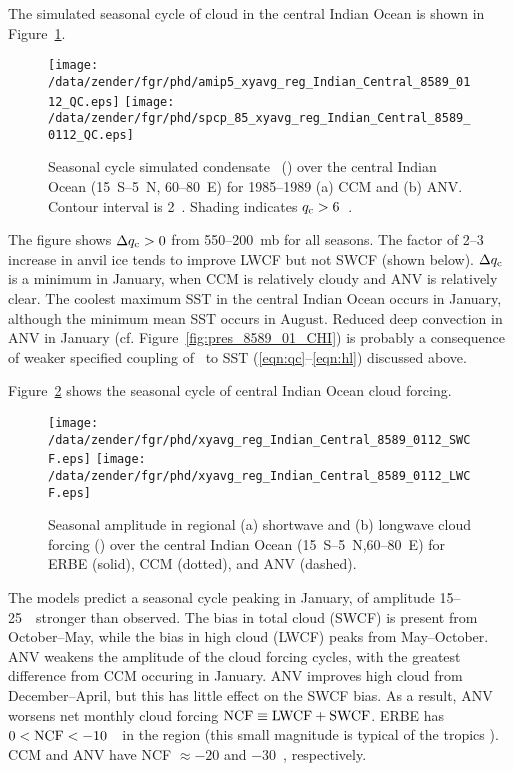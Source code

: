 \documentclass[agums]{aguplus}
\begin{document}
The simulated seasonal cycle of cloud in the central Indian Ocean is
shown in Figure~\ref{fig:reg_xyavg_Indian_Central_0112_QC}.
\begin{figure}
\begin{center}
\texttt{[image: /data/zender/fgr/phd/amip5\_xyavg\_reg\_Indian\_Central\_8589\_0112\_QC.eps]}\vfill
\texttt{[image: /data/zender/fgr/phd/spcp\_85\_xyavg\_reg\_Indian\_Central\_8589\_0112\_QC.eps]}\vfill
\end{center}
\caption[Seasonal cycle of simulated condensate \qc\ over the central
Indian Ocean for 1985--1989]{
Seasonal cycle simulated condensate \qc\ (\mgxkg) over the central
Indian Ocean (15~\dgr S--5~\dgr N, 60--80~\dgr E) for
1985--1989 (a) CCM and (b) ANV.  
Contour interval is 2~\mgxkg.
Shading indicates $\mbox{$q_\mathrm{c}$} > 6$~\mgxkg.
\label{fig:reg_xyavg_Indian_Central_0112_QC}}   
\end{figure}
The figure shows $\Delta \mbox{$q_\mathrm{c}$} > 0$ from 550--200~mb for all seasons.
The factor of 2--3 increase in anvil ice tends to improve LWCF but not
SWCF (shown below).
$\Delta \mbox{$q_\mathrm{c}$}$ is a minimum in January, when CCM is relatively cloudy
and ANV is relatively clear.
The coolest maximum SST in the central Indian Ocean occurs in January,
although the minimum mean SST occurs in August.
Reduced deep convection in ANV in January
(cf. Figure~\ref{fig:pres_8589_01_CHI}) is probably a consequence of
weaker specified coupling of \qc\ to SST (\ref{eqn:qc}--\ref{eqn:hl})
discussed above.  

Figure~\ref{fig:xyavg_reg_8589_0112_ocean_CF} shows the seasonal cycle
of central Indian Ocean cloud forcing.
\begin{figure}
\begin{center}
\texttt{[image: /data/zender/fgr/phd/xyavg\_reg\_Indian\_Central\_8589\_0112\_SWCF.eps]}\vfill
\texttt{[image: /data/zender/fgr/phd/xyavg\_reg\_Indian\_Central\_8589\_0112\_LWCF.eps]}\vfill
\end{center}
\caption[Seasonal amplitude in regional shortwave and longwave
cloud forcing over central Indian Ocean for ERBE, CCM, and ANV]{ 
Seasonal amplitude in regional (a) shortwave and (b) longwave
cloud forcing (\wxmS ) over the central Indian Ocean
(15~\dgr S--5~\dgr N,60--80~\dgr E) for ERBE (solid), CCM
(dotted), and ANV (dashed).
\label{fig:xyavg_reg_8589_0112_ocean_CF}}
\end{figure}
The models predict a seasonal cycle peaking in January, of amplitude
15--25~\wxmS\ stronger than observed.
The bias in total cloud (SWCF) is present from October--May, while the
bias in high cloud (LWCF) peaks from May--October.
ANV weakens the amplitude of the cloud forcing cycles, with the
greatest difference from CCM occuring in January.
ANV improves high cloud from December--April, but this has little
effect on the SWCF bias.
As a result, ANV worsens net monthly cloud forcing $\mbox{\textrm{NCF}} \equiv \mbox{\textrm{LWCF}}
+ \mbox{\textrm{SWCF}}$. 
ERBE has $0 < \mbox{\textrm{NCF}} < -10$~\wxmS\ in the region
(this small magnitude is typical of the tropics \cite[]{Kie941}). 
CCM and ANV have NCF $\approx -20$ and $-30$~\wxmS, respectively. 
\end{document}
